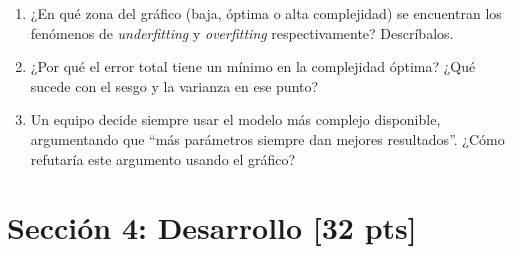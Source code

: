 \documentclass[11pt,a4paper]{article}
\newcommand{\puntaje}[1]{\textbf{[#1 pts]}}
\begin{document}
\vspace{0.3cm}

\begin{enumerate}[label=\textbf{\alph*)}]
  \item ¿En qu\'e zona del gr\'afico (baja, \'optima o alta complejidad) se encuentran los fen\'omenos de \textit{underfitting} y \textit{overfitting} respectivamente? Descr\'ibalos.

  \vspace{2.5cm}

  \item ¿Por qu\'e el error total tiene un m\'inimo en la complejidad \'optima? ¿Qu\'e sucede con el sesgo y la varianza en ese punto?

  \vspace{2.5cm}

  \item Un equipo decide siempre usar el modelo m\'as complejo disponible, argumentando que ``m\'as par\'ametros siempre dan mejores resultados''. ¿C\'omo refutar\'ia este argumento usando el gr\'afico?

  \vspace{2.5cm}
\end{enumerate}

\vspace{0.3cm}

\section*{Secci\'on 4: Desarrollo \puntaje{32}}
\end{document}
